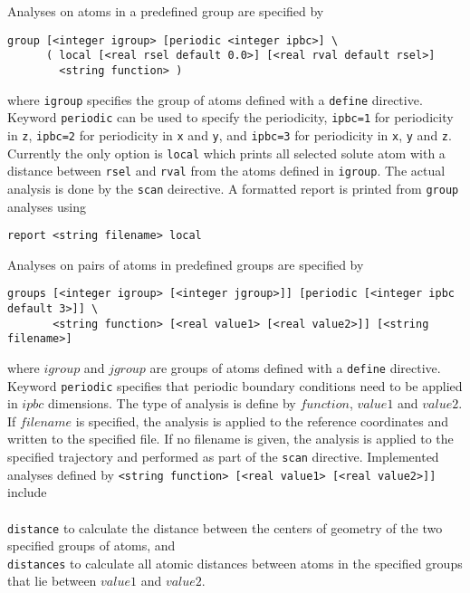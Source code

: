 Analyses on atoms in a predefined group are specified by

\begin{verbatim}
group [<integer igroup> [periodic <integer ipbc>] \
      ( local [<real rsel default 0.0>] [<real rval default rsel>]
        <string function> )
\end{verbatim}
where \verb+igroup+ specifies the group of atoms defined with a
\verb+define+ directive. Keyword \verb+periodic+ can be used to
specify the periodicity, \verb+ipbc=1+ for periodicity in \verb+z+, 
\verb+ipbc=2+ for periodicity in \verb+x+ and \verb+y+, and
\verb+ipbc=3+ for periodicity in \verb+x+, \verb+y+ and \verb+z+.
Currently the only option is \verb+local+ which prints all selected 
solute atom with a distance between \verb+rsel+ and \verb+rval+ from
the atoms defined in \verb+igroup+. The actual analysis is done by the
\verb+scan+ deirective. A formatted report is printed from 
\verb+group+ analyses using

\begin{verbatim}
report <string filename> local
\end{verbatim}

Analyses on pairs of atoms in predefined groups are specified by

\begin{verbatim}
groups [<integer igroup> [<integer jgroup>]] [periodic [<integer ipbc default 3>]] \ 
       <string function> [<real value1> [<real value2>]] [<string filename>]
\end{verbatim}

where $igroup$ and $jgroup$ are groups of atoms defined with a
\verb+define+ directive. Keyword \verb+periodic+ specifies that
periodic boundary conditions need to be applied in $ipbc$ dimensions.
The type of analysis is define by $function$, $value1$ and $value2$.
If $filename$ is specified, the analysis is applied to the reference
coordinates and written to the specified file. If no filename is
given, the analysis is applied to the specified trajectory and 
performed as part of the \verb+scan+ directive.
Implemented analyses defined by 
\verb+<string function> [<real value1> [<real value2>]]+ include\\
\\
\verb+distance+ to calculate the distance between the centers of geometry of the 
two specified groups of atoms, and\\
\verb+distances+ to calculate all atomic distances between atoms
in the specified groups that lie between $value1$ and $value2$.


